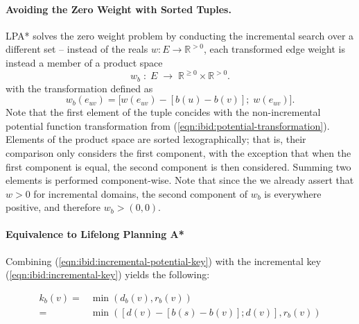 \paragraph{Avoiding the Zero Weight with Sorted Tuples.}
LPA* solves the zero weight problem by conducting the incremental
search over a different set --
instead of the reals $w : E \rightarrow \mathbb{R}^{> 0}$,
each transformed edge weight is instead a member of a product space
\begin{equation}
   w_b \;:\; E \;\rightarrow\; \mathbb{R}^{\geq 0} \!\times\! \mathbb{R}^{> 0}.
\end{equation}
with the transformation defined as
\begin{equation}
   w_b(e_{uv}) = \big[ w(e_{uv}) - [b(u) - b(v)]; \; w(e_{uv}) \big].
   \label{eqn:ibid:incremental-potential-key}
\end{equation}
Note that the first element of the tuple concides with the
non-incremental potential function transformation from
(\ref{eqn:ibid:potential-transformation}).
Elements of the product space are sorted lexographically;
that is, their comparison only considers the first component,
with the exception that when the first component is equal,
the second component is then considered.
Summing two elements is performed component-wise.
Note that since the we already assert that $w > 0$ for incremental
domains,
the second component of $w_b$ is everywhere positive,
and therefore $w_b > (0,0)$.

\paragraph{Equivalence to Lifelong Planning A*}
Combining (\ref{eqn:ibid:incremental-potential-key})
with the incremental key (\ref{eqn:ibid:incremental-key})
yields the following:


\begin{subequations}%
   \begin{align}
      k_b(v) = & \min\left( d_b(v), r_b(v) \right) \\
         = & \min\left( \left[ d(v) - [ b(s) - b(v) ]; d(v) \right],
            r_b(v) \right)
   \end{align}%
\end{subequations}%


